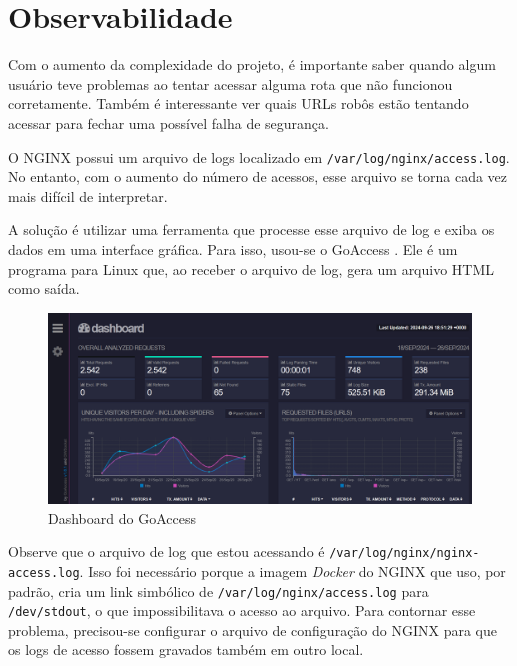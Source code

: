 \chapter{Observabilidade}

Com o aumento da complexidade do projeto, é importante saber quando algum usuário 
teve problemas ao tentar acessar alguma rota que não funcionou corretamente.
Também é interessante ver quais URLs robôs estão tentando acessar para fechar uma
possível falha de segurança.

O NGINX possui um arquivo de logs localizado em \verb|/var/log/nginx/access.log|. 
No entanto, com o aumento do número de acessos, esse arquivo se torna cada vez 
mais difícil de interpretar.

A solução é utilizar uma ferramenta que processe esse arquivo de log e exiba os 
dados em uma interface gráfica. Para isso, usou-se o GoAccess \cite{goaccess}. Ele 
é um programa para Linux que, ao receber o arquivo de log, gera um arquivo HTML 
como saída.




\begin{figure}[ht]
    \begin{center}
    \includegraphics[width=400pt]{img/dashboard.png}
    \caption{Dashboard do GoAccess}
    \label{fig:cloudflare-stat.png}
    \end{center}
\end{figure}

Observe que o arquivo de log que estou acessando é \verb|/var/log/nginx/nginx-access.log|. 
Isso foi necessário porque a imagem \textit{Docker} do NGINX que uso, por padrão, cria um 
link simbólico de \verb|/var/log/nginx/access.log| para \verb|/dev/stdout|, o que 
impossibilitava o acesso ao arquivo. Para contornar esse problema, precisou-se 
configurar o arquivo de configuração do NGINX para que os logs de acesso fossem 
gravados também em outro local.


